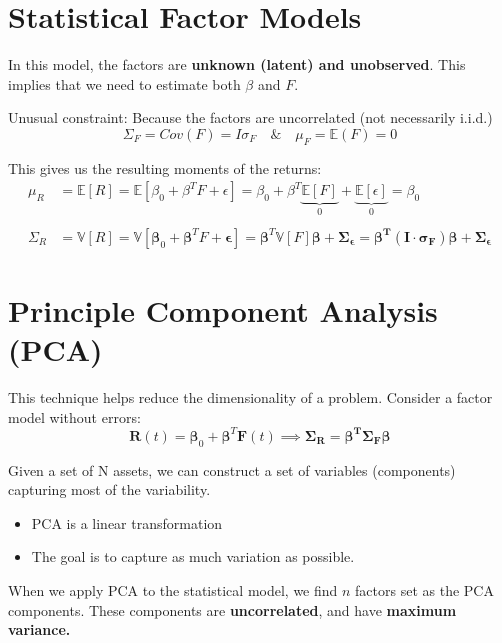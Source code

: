 \documentclass[
  oneside]{book}
\providecommand{\tightlist}{%
  \setlength{\itemsep}{0pt}\setlength{\parskip}{0pt}}
\begin{document}
\hypertarget{statistical-factor-models}{%
\section{Statistical Factor Models}\label{statistical-factor-models}}

In this model, the factors are \textbf{unknown (latent) and unobserved}. This implies that we need to estimate both \(\beta\) and \(F\).

Unusual constraint: Because the factors are uncorrelated (not necessarily i.i.d.)
\[
\Sigma_{F} = Cov(F)= I \sigma_F \quad \& \quad \mu_{F}=\mathbb{E}(F) = 0
\]

This gives us the resulting moments of the returns:
\[
\begin{aligned}
\mu_{R} &= \mathbb{E}[R] = \mathbb{E}[\beta_{0}+\beta^TF + \epsilon] = \beta_{0}+\beta^{T}\underbrace{ \mathbb{E}[F] }_{ 0 }+\underbrace{ \mathbb{E}[\epsilon] }_{ 0 } = \beta_{0}\\
\\
\Sigma_{R} &= \mathbb{V}[R] = \mathbb{V}[\boldsymbol{\beta}_{0}+\boldsymbol{\beta}^{T}F+\boldsymbol{\epsilon}] = \boldsymbol{\beta}^{T}\mathbb{V}[F]\boldsymbol{\beta}+\boldsymbol{\Sigma_{\epsilon} = \beta^{T}(I\cdot \sigma_{F})\beta+\Sigma_{\epsilon}}
\end{aligned}
\]

\hypertarget{principle-component-analysis-pca}{%
\section{Principle Component Analysis (PCA)}\label{principle-component-analysis-pca}}

This technique helps reduce the dimensionality of a problem. Consider a factor model without errors:
\[
\mathbf{R}(t) = \boldsymbol{\beta}_{0}+\boldsymbol{\beta}^{T}\mathbf{F}(t) \implies \boldsymbol{\Sigma_{R}=\beta^{T}\Sigma_{F}\beta}
\]

Given a set of N assets, we can construct a set of variables (components) capturing most of the variability.

\begin{itemize}
\tightlist
\item
  PCA is a linear transformation
\item
  The goal is to capture as much variation as possible.
\end{itemize}

When we apply PCA to the statistical model, we find \(n\) factors set as the PCA components. These components are \textbf{uncorrelated}, and have \textbf{maximum variance.}
\end{document}
